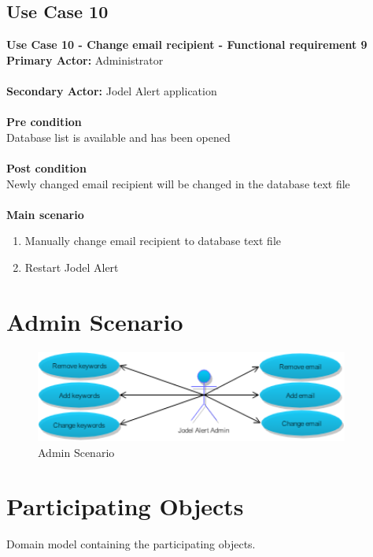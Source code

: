 \documentclass[a4paper,12pt]{article}
\begin{document}
\subsection{Use Case 10}
\textbf{Use Case 10 - Change email recipient - Functional requirement 9}\\
\textbf{Primary Actor:}
Administrator\\\\
\textbf{Secondary Actor:}
Jodel Alert application\\\\
\textbf{Pre condition}\\
Database list is available and has been opened\\\\
\textbf{Post condition}\\
Newly changed email recipient will be changed in the database text file\\\\
\textbf{Main scenario}
\begin{enumerate}
	\item Manually change email recipient to database text file
	\item Restart Jodel Alert
\end{enumerate}
\clearpage
\section{Admin Scenario}
\begin{figure}[!h]
	\centering
	\includegraphics[height=3cm]{img/scenarioadmin.png}
	\caption{Admin Scenario}
	\label{Participating objects}
\end{figure}
\section{Participating Objects}
Domain model containing the participating objects.\\
\end{document}
